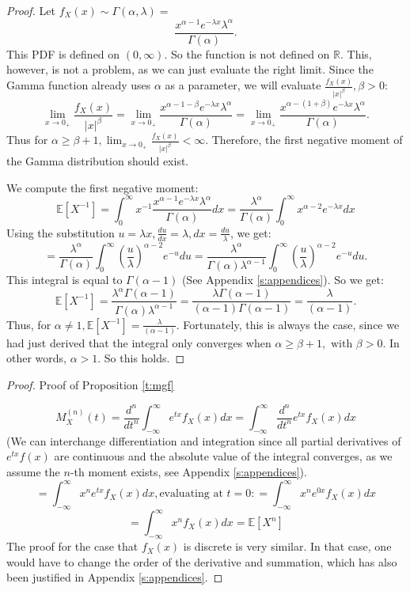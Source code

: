 \begin{proof}\label{p:negative}
    Let \(f_X(x) \sim \Gamma(\alpha, \lambda) =\) 
    \[\frac{x^{\alpha -1} e^{-\lambda x} \lambda^\alpha} {\Gamma(\alpha)}.\] This PDF is defined on \((0, \infty)\). So the function is not defined on \(\mathbb{R}\). This, however, is not a problem, as we can just evaluate the right limit. Since the Gamma function already uses \(\alpha\) as a parameter, we will evaluate \( \displaystyle \frac{f_X(x)}{|x|^\beta}, \beta > 0\):
    \[\lim_{x \to 0_+} \frac{f_X(x)}{|x|^\beta} = \lim_{x \to 0_+} \frac{x^{\alpha -1 - \beta} e^{-\lambda x} \lambda^\alpha} {\Gamma(\alpha)} = \lim_{x \to 0_+} \frac{x^{\alpha -(1 + \beta)} e^{-\lambda x} \lambda^\alpha} {\Gamma(\alpha)} .\] Thus for \(\alpha \geq \beta + 1, \lim_{x \to 0_+} \frac{f_X(x)}{|x|^\beta} < \infty\). Therefore, the first negative moment of the Gamma distribution should exist.

    We compute the first negative moment: 
    \[ \mathbb{E}[X^{-1}] = \int_{0}^{\infty} x^{-1} \frac{x^{\alpha -1} e^{-\lambda x} \lambda^\alpha} {\Gamma(\alpha)} dx = \frac{\lambda^\alpha}{\Gamma(\alpha)} \int_{0}^{\infty} x^{\alpha - 2} e^{-\lambda x} dx\]
    Using the substitution \(\displaystyle u = \lambda x, \frac{du}{dx} = \lambda, dx = \frac{du}{\lambda}\), we get:
    \[ = \frac{\lambda^\alpha}{\Gamma(\alpha)} \int_{0}^{\infty}\left(\frac{u}{\lambda}\right)^{\alpha -2} e^{-u} du = \frac{\lambda^\alpha}{\Gamma(\alpha) \lambda^{\alpha-1}} \int_{0}^{\infty}(\frac{u}{\lambda})^{\alpha -2} e^{-u} du.\] This integral is equal to \(\Gamma(\alpha - 1)\) (See Appendix \ref{s:appendices}). So we get: 
    \[\mathbb{E}[X^{-1}] = \frac{\lambda^\alpha \Gamma(\alpha - 1) }{\Gamma(\alpha) \lambda^{\alpha-1}} = \frac{\lambda \Gamma(\alpha - 1)}{(\alpha -1)\Gamma(\alpha - 1)} = \frac{\lambda}{(\alpha -1)}.\] Thus, for \(\alpha \neq 1, \mathbb{E}[X^{-1}] = \frac{\lambda}{(\alpha -1)}\). Fortunately, this is always the case, since we had just derived that the integral only converges when \(\alpha \geq \beta + 1, \text{ with } \beta > 0\). In other words, \(\alpha > 1\). So this holds.
\end{proof}

\begin{proof} Proof of Proposition \ref{t:mgf}

    \[M_X^{(n)}(t) = \frac{d^n}{dt^n} \int_{-\infty}^{\infty} e^{tx} f_X(x) dx = \int_{-\infty}^{\infty} \frac{d^n}{dt^n} e^{tx} f_X(x) dx\] (We can interchange differentiation and integration since all partial derivatives of \(e^{tx} f(x)\) are continuous and the absolute value of the integral converges, as we assume the \(n\)-th moment exists, see Appendix \ref{s:appendices}).
    \[ = \int_{-\infty}^{\infty} x^n e^{tx} f_X(x) dx, \text{evaluating at } t = 0: = \int_{-\infty}^{\infty} x^n e^{0x} f_X(x) dx\]
    \[ = \int_{-\infty}^{\infty} x^n f_X(x) dx = \mathbb{E}[X^n]\]
    The proof for the case that \(f_X(x)\) is discrete is very similar. In that case, one would have to change the order of the derivative and summation, which has also been justified in Appendix \ref{s:appendices}.
\end{proof}

